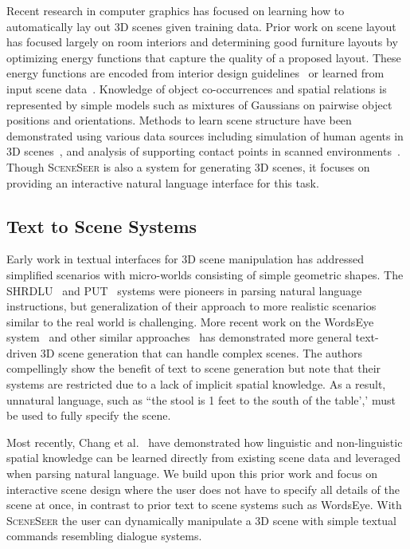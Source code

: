 \documentclass{sigchi}
\newcommand{\SceneSeer}{\textsc{SceneSeer}\xspace}
\begin{document}
Recent research in computer graphics has focused on learning how to automatically lay out 3D scenes given training data.  Prior work on scene layout has focused largely on room interiors and determining good furniture layouts by optimizing energy functions that capture the quality of a proposed layout.  These energy functions are encoded from interior design guidelines~\cite{merrell2011interactive} or learned from input scene data~\cite{fisher2012example}.  Knowledge of object co-occurrences and spatial relations is represented by simple models such as mixtures of Gaussians on pairwise object positions and orientations. Methods to learn scene structure have been demonstrated using various data sources including simulation of human agents in 3D scenes~\cite{jiang2012learning,jiang2013infinite}, and analysis of supporting contact points in scanned environments~\cite{rosman2011learning}.  Though \SceneSeer is also a system for generating 3D scenes, it focuses on providing an interactive natural language interface for this task.

\subsection{Text to Scene Systems}

Early work in textual interfaces for 3D scene manipulation has addressed simplified scenarios with micro-worlds consisting of simple geometric shapes.  The SHRDLU~\cite{winograd1972understanding} and PUT~\cite{clay1996put} systems were pioneers in parsing natural language instructions, but generalization of their approach to more realistic scenarios similar to the real world is challenging.  More recent work on the WordsEye system~\cite{coyne2001wordseye,coyne2012annotation} and other similar approaches~\cite{seversky2006real} has demonstrated more general text-driven 3D scene generation that can handle complex scenes.  The authors compellingly show the benefit of text to scene generation but note that their systems are restricted due to a lack of implicit spatial knowledge.  As a result, unnatural language, such as ``the stool is 1 feet to the south of the table',' must be used to fully specify the scene.

Most recently, Chang et al.~\cite{chang2014spatial} have demonstrated how linguistic and non-linguistic spatial knowledge can be learned directly from existing scene data and leveraged when parsing natural language.  We build upon this prior work and focus on interactive scene design where the user does not have to specify all details of the scene at once, in contrast to prior text to scene systems such as WordsEye.  With \SceneSeer the user can dynamically manipulate a 3D scene with simple textual commands resembling dialogue systems.
\end{document}
